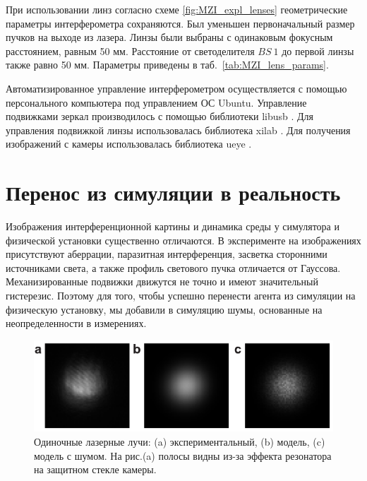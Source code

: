 При использовании линз согласно схеме \ref{fig:MZI_expl_lenses} геометрические параметры интерферометра сохраняются. Был уменьшен первоначальный размер пучков на выходе из лазера. Линзы были выбраны с одинаковым фокусным расстоянием, равным 50 мм. Расстояние от светоделителя $BS\ 1$ до первой линзы также равно 50 мм. Параметры приведены в таб.~\ref{tab:MZI_lens_params}. 


Автоматизированное управление интерферометром осуществляется с помощью персонального компьютера под управлением ОС Ubuntu. Управление подвижками зеркал производилось с помощью библиотеки libusb \cite{libusb}. Для управления подвижкой линзы использовалась библиотека xilab \cite{standa_soft}. Для получения изображений с камеры использовалась библиотека ueye \cite{ids_soft}. 

\section{Перенос из симуляции в реальность}\label{sec:ch2/sec6}

Изображения интерференционной картины и динамика среды у симулятора и физической установки существенно отличаются. В эксперименте на изображениях присутствуют аберрации, паразитная интерференция, засветка сторонними источниками света, а также профиль светового пучка отличается от Гауссова. Механизированные подвижки движутся не точно и имеют значительный гистерезис. Поэтому для того, чтобы успешно перенести агента из симуляции на физическую установку, мы добавили в симуляцию шумы, основанные на неопределенности в измерениях.

\begin{figure}
\centering
  \includegraphics[width=0.8\linewidth]{images/beamsamples.pdf}

\caption{Одиночные лазерные лучи: (a) экспериментальный, (b) модель, (c) модель с шумом. На рис.(a) полосы видны из-за эффекта резонатора на защитном стекле камеры.}
\label{fig:rad_fit}
\end{figure}


